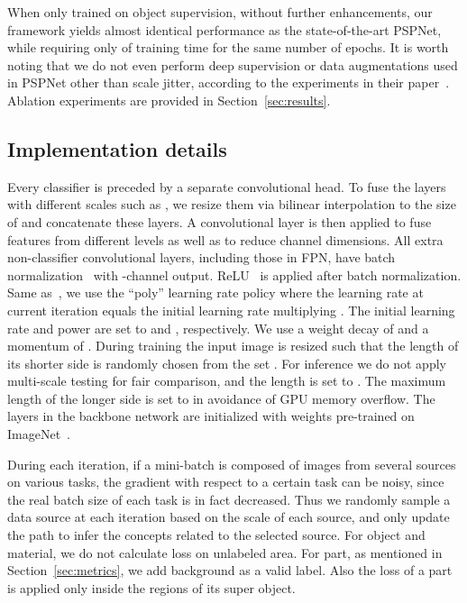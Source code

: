 \documentclass[runningheads]{llncs}
\begin{document}
When only trained on object supervision, without further enhancements, our framework yields almost identical performance as the state-of-the-art PSPNet, while requiring only  of training time for the same number of epochs. It is worth noting that we do not even perform deep supervision or data augmentations used in PSPNet other than scale jitter, according to the experiments in their paper~\cite{zhao2017pyramid}. Ablation experiments are provided in Section~\ref{sec:results}.

\subsection{Implementation details}
Every classifier is preceded by a separate convolutional head. To fuse the layers with different scales such as , we resize them via bilinear interpolation to the size of  and concatenate these layers. A convolutional layer is then applied to fuse features from different levels as well as to reduce channel dimensions. All extra non-classifier convolutional layers, including those in FPN, have batch normalization~\cite{ioffe2015batch} with -channel output. ReLU~\cite{nair2010rectified} is applied after batch normalization. Same as~\cite{chen2016deeplab}, we use the ``poly'' learning rate policy where the learning rate at current iteration equals the initial learning rate multiplying . The initial learning rate and power are set to  and , respectively. We use a weight decay of  and a momentum of . During training the input image is resized such that the length of its shorter side is randomly chosen from the set . For inference we do not apply multi-scale testing for fair comparison, and the length is set to . The maximum length of the longer side is set to  in avoidance of GPU memory overflow. The layers in the backbone network are initialized with weights pre-trained on ImageNet~\cite{deng2009imagenet}. 

During each iteration, if a mini-batch is composed of images from several sources on various tasks, the gradient with respect to a certain task can be noisy, since the real batch size of each task is in fact decreased. Thus we randomly sample a data source at each iteration based on the scale of each source, and only update the path to infer the concepts related to the selected source. For object and material, we do not calculate loss on unlabeled area. For part, as mentioned in Section~\ref{sec:metrics}, we add background as a valid label. Also the loss of a part is applied only inside the regions of its super object.
\end{document}
